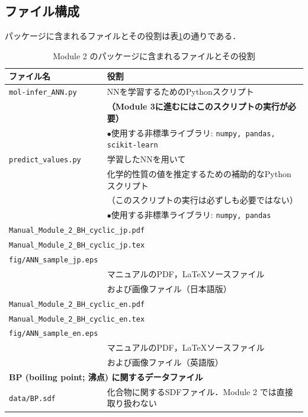 \documentclass[11pt,dvipdfmx,twoside]{jarticle}
\newcommand{\tabref}[1]{表\ref{tab:#1}}
\begin{document}
\subsection{ファイル構成}
パッケージに含まれるファイルとその役割は\tabref{files}の通りである．
\begin{table}[h!]
  \centering
  \caption{Module 2 のパッケージに含まれるファイルとその役割}
  \label{tab:files}
  \begin{tabular}{lcll}
  \hline
  \bf ファイル名 &\ \ & \multicolumn{2}{l}{\bf 役割}\\
  \hline
  \verb|mol-infer_ANN.py| && \multicolumn{2}{l}{NNを学習するためのPythonスクリプト}\\
  &&\multicolumn{2}{l}{\bf （Module 3に進むにはこのスクリプトの実行が必要）}\\
  &&\multicolumn{2}{l}{$\bullet$使用する非標準ライブラリ: {\tt numpy, pandas, scikit-learn}}\\
  \hline
  \verb|predict_values.py| && \multicolumn{2}{l}{学習したNNを用いて}\\
  &&\multicolumn{2}{l}{化学的性質の値を推定するための補助的なPythonスクリプト}\\
  &&\multicolumn{2}{l}{（このスクリプトの実行は必ずしも必要ではない）}\\
  &&\multicolumn{2}{l}{$\bullet$使用する非標準ライブラリ: {\tt numpy, pandas}}\\
  \hline
  \multicolumn{4}{l}{\tt Manual\_Module\_2\_BH\_cyclic\_jp.pdf}\\
  \multicolumn{4}{l}{\tt Manual\_Module\_2\_BH\_cyclic\_jp.tex}\\
  \multicolumn{4}{l}{\tt fig/ANN\_sample\_jp.eps}\\
  &&\multicolumn{2}{l}{マニュアルのPDF，\LaTeX ソースファイル}\\
  &&\multicolumn{2}{l}{および画像ファイル（日本語版）}\\
  \hline
  \multicolumn{4}{l}{\tt Manual\_Module\_2\_BH\_cyclic\_en.pdf}\\
  \multicolumn{4}{l}{\tt Manual\_Module\_2\_BH\_cyclic\_en.tex}\\
  \multicolumn{4}{l}{\tt fig/ANN\_sample\_en.eps}\\
  &&\multicolumn{2}{l}{マニュアルのPDF，\LaTeX ソースファイル}\\
  &&\multicolumn{2}{l}{および画像ファイル（英語版）}\\
  \hline
  \multicolumn{4}{l}{\bf BP (boiling point; 沸点) に関するデータファイル}\\
  \multicolumn{2}{l}{\tt data/BP.sdf} & \multicolumn{2}{l}{化合物に関するSDFファイル．Module 2 では直接取り扱わない}\\

\end{tabular}
\end{table}
\end{document}

